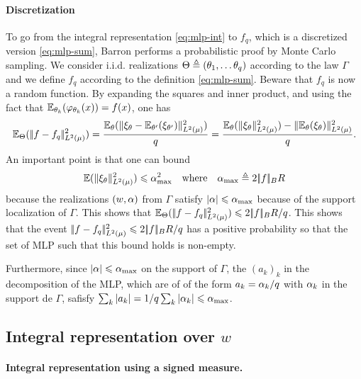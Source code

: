 \paragraph{Discretization}

To go from the integral representation \eqref{eq:mlp-int} to $f_q$, which is a discretized version \eqref{eq:mlp-sum}, Barron performs a probabilistic proof by Monte Carlo sampling. We consider i.i.d. realizations $\Theta \triangleq (\theta_1, \ldots \theta_q)$  according to the law $\Gamma$ and we define $ f_q $ according to the definition \eqref{eq:mlp-sum}. Beware that $f_q$ is now a random function. 
%
By expanding the squares and inner product, and using the fact that $\mathbb{E}_{\theta_k}(\varphi_{\theta_k}(x)) = f(x)$, 
one has
\begin{equation}
    \mathbb{E}_{\Theta}(|\!| f- f_q |\!|^2_{L^2(\mu)}) 
   		= \frac{ \mathbb{E}_\theta( \|\xi_\theta - \mathbb{E}_{\theta'}(\xi_{\theta'})\|_{L^2(\mu)}^2) }{q} 
       = \frac{ \mathbb{E}_\theta( \|\xi_\theta\|_{L^2(\mu)}^2) - \|\mathbb{E}_\theta( \xi_\theta)\|_{L^2(\mu)}^2 }{q} .
\end{equation}
An important point is that one can bound 
$$
    \mathbb{E}( \|\xi_\theta\|_{L^2(\mu)}^2 ) \leqslant 
    \alpha_{\max}^2
    \quad \text{where} \quad
    \alpha_{\max} \triangleq 2 |\!| f |\!|_B R
$$ 
because the realizations $(w,\alpha)$ from $\Gamma$ satisfy $|\alpha| \leqslant \alpha_{\max}$ because of the support localization of $\Gamma$. 
%
This shows that $\mathbb{E}_{\Theta}(|\!| f- f_q |\!|^2_{L^2(\mu)}) \leqslant 2 |\!| f |\!|_B R / q$. This shows that 
the event $|\!| f- f_q |\!|^2_{L^2(\mu)} \leqslant 2 |\!| f |\!|_B R / q$ has a positive probability so that the set of MLP such that this bound holds is non-empty. 

Furthermore, since $|\alpha| \leqslant \alpha_{\max}$ on the support of $\Gamma$, the $(a_k)_k$ in the decomposition of the MLP, which are of of the form $a_k=\alpha_k/q$ with $\alpha_k$ in the support de $\Gamma$,  safisfy $\sum_k |a_k| = 1/q \sum_k |\alpha_k| \leqslant \alpha_{\max}$.


\subsection{Integral representation over $w$}

\paragraph{Integral representation using a signed measure.}

